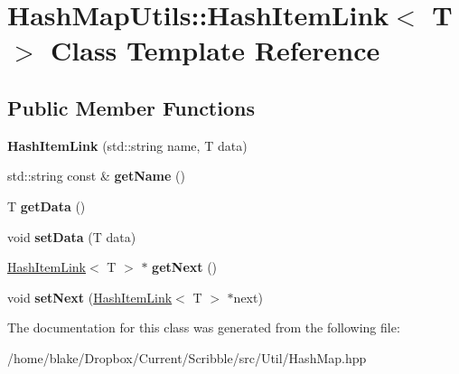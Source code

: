 \hypertarget{class_hash_map_utils_1_1_hash_item_link}{\section{Hash\-Map\-Utils\-:\-:Hash\-Item\-Link$<$ T $>$ Class Template Reference}
\label{class_hash_map_utils_1_1_hash_item_link}
}
\subsection*{Public Member Functions}
\begin{DoxyCompactItemize}
\item 
\hypertarget{class_hash_map_utils_1_1_hash_item_link_a05b2439be19a8b3cd0c89c232f4b6a67}{{\bfseries Hash\-Item\-Link} (std\-::string name, T data)}\label{class_hash_map_utils_1_1_hash_item_link_a05b2439be19a8b3cd0c89c232f4b6a67}

\item 
\hypertarget{class_hash_map_utils_1_1_hash_item_link_a6b954b31f27fd52a7277019397c14409}{std\-::string const \& {\bfseries get\-Name} ()}\label{class_hash_map_utils_1_1_hash_item_link_a6b954b31f27fd52a7277019397c14409}

\item 
\hypertarget{class_hash_map_utils_1_1_hash_item_link_a2dd174171b1c958a00bf48bcd5a8a9f7}{T {\bfseries get\-Data} ()}\label{class_hash_map_utils_1_1_hash_item_link_a2dd174171b1c958a00bf48bcd5a8a9f7}

\item 
\hypertarget{class_hash_map_utils_1_1_hash_item_link_a96655dcffac5172a523be11c2b6a1aca}{void {\bfseries set\-Data} (T data)}\label{class_hash_map_utils_1_1_hash_item_link_a96655dcffac5172a523be11c2b6a1aca}

\item 
\hypertarget{class_hash_map_utils_1_1_hash_item_link_a60ac00e44d88e971b194ffbea03663e0}{\hyperlink{class_hash_map_utils_1_1_hash_item_link}{Hash\-Item\-Link}$<$ T $>$ $\ast$ {\bfseries get\-Next} ()}\label{class_hash_map_utils_1_1_hash_item_link_a60ac00e44d88e971b194ffbea03663e0}

\item 
\hypertarget{class_hash_map_utils_1_1_hash_item_link_a5d479e2c10ad680298652fab089cfbd7}{void {\bfseries set\-Next} (\hyperlink{class_hash_map_utils_1_1_hash_item_link}{Hash\-Item\-Link}$<$ T $>$ $\ast$next)}\label{class_hash_map_utils_1_1_hash_item_link_a5d479e2c10ad680298652fab089cfbd7}

\end{DoxyCompactItemize}


The documentation for this class was generated from the following file\-:\begin{DoxyCompactItemize}
\item 
/home/blake/\-Dropbox/\-Current/\-Scribble/src/\-Util/Hash\-Map.\-hpp\end{DoxyCompactItemize}
